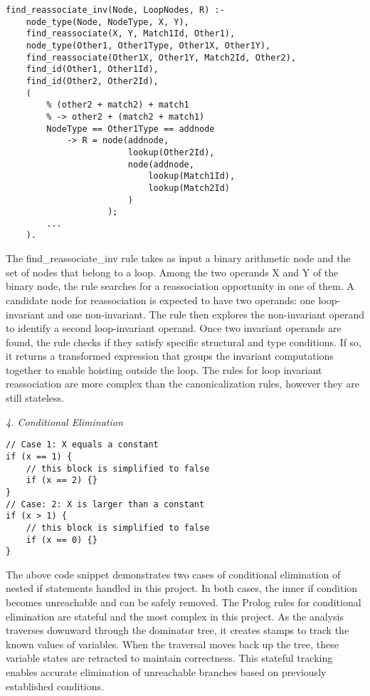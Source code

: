 \begin{lstlisting}
find_reassociate_inv(Node, LoopNodes, R) :-
    node_type(Node, NodeType, X, Y),
    find_reassociate(X, Y, Match1Id, Other1),
    node_type(Other1, Other1Type, Other1X, Other1Y),
    find_reassociate(Other1X, Other1Y, Match2Id, Other2),
    find_id(Other1, Other1Id),
    find_id(Other2, Other2Id),
    (
        % (other2 + match2) + match1 
        % -> other2 + (match2 + match1)
        NodeType == Other1Type == addnode
            -> R = node(addnode, 
                        lookup(Other2Id), 
                        node(addnode, 
                            lookup(Match1Id), 
                            lookup(Match2Id)
                        )
                    );
        ...
    ).
\end{lstlisting}
The find_reassociate_inv rule takes as input a binary arithmetic node and the set of nodes that belong to a loop. Among the two operands X and Y of the binary node, the rule searches for a reassociation opportunity in one of them. A candidate node for reassociation is expected to have two operands: one loop-invariant and one non-invariant. The rule then explores the non-invariant operand to identify a second loop-invariant operand. Once two invariant operands are found, the rule checks if they satisfy specific structural and type conditions. If so, it returns a transformed expression that groups the invariant computations together to enable hoisting outside the loop.
The rules for loop invariant reassociation are more complex than the canonicalization rules, however they are still stateless.

\bigbreak
\textit{4. Conditional Elimination}
\smallbreak

\begin{lstlisting}
// Case 1: X equals a constant
if (x == 1) {
    // this block is simplified to false
    if (x == 2) {}
}
// Case: 2: X is larger than a constant
if (x > 1) {
    // this block is simplified to false
    if (x == 0) {}
}
\end{lstlisting}

The above code snippet demonstrates two cases of conditional elimination of nested if statements handled in this project. In both cases, the inner if condition becomes unreachable and can be safely removed.
The Prolog rules for conditional elimination are stateful and the most complex in this project. As the analysis traverses downward through the dominator tree, it creates stamps to track the known values of variables. When the traversal moves back up the tree, these variable states are retracted to maintain correctness. This stateful tracking enables accurate elimination of unreachable branches based on previously established conditions.


